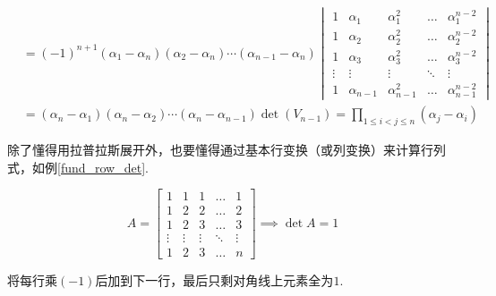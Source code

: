 \begin{theorem}
\begin{analysis}
\[\begin{aligned}
&=(-1)^{n+1}(\alpha_1-\alpha_n)(\alpha_2-\alpha_n)\cdots(\alpha_{n-1}-\alpha_n)\begin{vmatrix}1&\alpha _{1}&\alpha _{1}^{2}&\dots &\alpha _{1}^{n-2}\\1&\alpha _{2}&\alpha _{2}^{2}&\dots &\alpha _{2}^{n-2}\\1&\alpha _{3}&\alpha _{3}^{2}&\dots &\alpha _{3}^{n-2}\\\vdots &\vdots &\vdots &\ddots &\vdots \\1&\alpha _{n-1}&\alpha _{n-1}^{2}&\dots &\alpha _{n-1}^{n-2}\end{vmatrix}\\
&=(\alpha_n-\alpha_1)(\alpha_n-\alpha_2)\cdots(\alpha_{n}-\alpha_{n-1})\det(V_{n-1})=\prod_{1\le i<j\le n} (\alpha_j-\alpha_i)
\end{aligned}\]
\end{analysis}
\end{theorem}
\par 除了懂得用拉普拉斯展开外，也要懂得通过基本行变换（或列变换）来计算行列式，如例\ref{fund_row_det}.
\begin{example}
\label{fund_row_det}
\[\displaystyle A={\begin{bmatrix}1&1&1&\dots &1\\1&2&2&\dots &2\\1&2&3&\dots &3\\\vdots &\vdots &\vdots &\ddots &\vdots \\1&2&3&\dots &n\end{bmatrix}}\implies\det A=1\]
\end{example}
\begin{analysis}
将每行乘$(-1)$后加到下一行，最后只剩对角线上元素全为$1$.
\end{analysis}